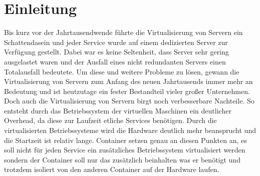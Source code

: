 \section{Einleitung}
\label{sec:Einleitung}

Bis kurz vor der Jahrtausendwende führte die Virtualisierung von Servern ein Schattendasein und jeder Service wurde auf einem dedizierten Server zur Verfügung gestellt. Dabei war es keine Seltenheit, dass Server sehr gering ausgelastet waren und der Ausfall eines nicht redundanten Servers einen Totalausfall bedeutete. Um diese und weitere Probleme zu lösen, gewann die Virtualisierung von Servern zum Anfang des neuen Jahrtausends immer mehr an Bedeutung und ist heutzutage ein fester Bestandteil vieler großer Unternehmen. Doch auch die Virtualisierung von Servern birgt noch verbesserbare Nachteile. So entsteht durch das Betriebssystem der virtuellen Maschinen ein deutlicher Overhead, da diese zur Laufzeit etliche Services benötigen. Durch die virtualisierten Betriebssysteme wird die Hardware deutlich mehr beansprucht und die Startzeit ist relativ lange.
Container setzen genau an diesen Punkten an, es soll nicht für jeden Service ein zusätzliches Betriebssystem virtualisiert werden sondern der Container soll nur das zusätzlich beinhalten was er benötigt und trotzdem isoliert von den anderen Container auf der Hardware laufen.\cite{12005068320161201}